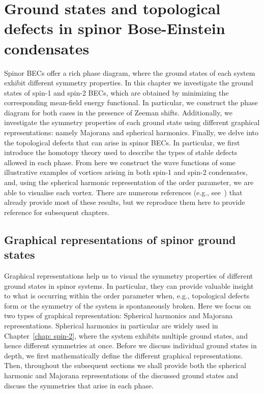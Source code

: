 \chapter[Ground states and topological defects in spinor Bose-Einstein
condensates][Ground states and topological defects]{\label{chap: ground-states}
Ground states and topological defects in spinor Bose-Einstein condensates}
Spinor BECs offer a rich phase diagram, where the ground states of each system
exhibit different symmetry properties.
In this chapter we investigate the ground states of spin-1 and spin-2 BECs,
which are obtained by minimizing the corresponding mean-field energy functional.
In particular, we construct the phase diagram for both cases in the presence
of Zeeman shifts.
Additionally, we investigate the symmetry properties of each ground state
using different graphical representations: namely Majorana and spherical
harmonics.
Finally, we delve into the topological defects that can arise in spinor
BECs.
In particular, we first introduce the homotopy theory used to describe the
types of stable defects allowed in each phase.
From here we construct the wave functions of some illustrative examples of
vortices arising in both spin-1 and spin-2 condensates, and,
using the spherical harmonic representation of the order parameter, we are able
to visualise each vortex.
There are numerous references (e.g., see~\cite{Ciobanu2000, Zhang2003,
Kawaguchi2012,Stamper-Kurn2013}) that already provide most of these results,
but we reproduce them here to provide reference for subsequent chapters.

\section{Graphical representations of spinor ground states}
Graphical representations help us to visual the symmetry properties of different
ground states in spinor systems.
In particular, they can provide valuable insight to what is occurring within
the order parameter when, e.g., topological defects form or the symmetry of the
system is spontaneously broken.
Here we focus on two types of graphical representation: Spherical harmonics and
Majorana representations.
Spherical harmonics in particular are widely used in Chapter~\ref{chap: spin-2},
where the system exhibits multiple ground states, and hence different symmetries
at once.
Before we discuss individual ground states in depth, we first mathematically
define the different graphical representations.
Then, throughout the subsequent sections we shall provide both the spherical
harmonic and Majorana representations of the discussed ground states and
discuss the symmetries that arise in each phase.

